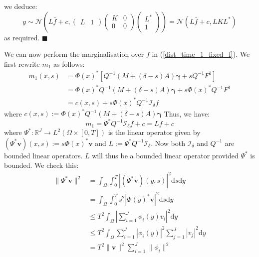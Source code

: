 \documentclass{article}
\renewcommand\qedsymbol{$\blacksquare$}
\theoremstyle{definition}
\theoremstyle{remark}
\theoremstyle{remark}
\begin{document}
we deduce:
\begin{equation*}
    y\sim\mathcal{N}\left(L\bar{f}+c, \begin{pmatrix}
        L & 1
    \end{pmatrix}\begin{pmatrix}
                    K & 0 \\
                    0 & 0
                \end{pmatrix}\begin{pmatrix}
                    L^{*} \\
                    1
                \end{pmatrix}\right)=\mathcal{N}(L\bar{f}+c,LKL^{*})
\end{equation*}
as required. \qedsymbol

We can now perform the marginalisation over $f$ in (\ref{dist_time_1_fixed_f}). We first rewrite $m_1$ as follows:
\begin{align*}
    m_{1}(x,s) &= \Phi(x)^{*}[Q^{-1}(M+(\delta-s)A)\boldsymbol{\gamma}+sQ^{-1}F^{1}] \\
    &= \Phi(x)^{*}Q^{-1}(M+(\delta-s)A)\boldsymbol{\gamma}+s\Phi(x)^{*}Q^{-1}F^{1} \\
    &=c(x,s) + s\Phi(x)^{*}Q^{-1}\mathcal{I}_{\delta}f
\end{align*}
where $c(x,s):=\Phi(x)^{*}Q^{-1}(M+(\delta-s)A)\boldsymbol{\gamma}$ Thus, we have:
\begin{equation*}
    m_1=\Psi^{*}Q^{-1}\mathcal{I}_{\delta}f+c=Lf+c
\end{equation*}
where $\Psi^{*}:\mathbb{R}^{J}\rightarrow L^{2}(\Omega\times[0,T])$ is the linear operator given by $(\Psi^{*}\boldsymbol{v})(x,s):=s\Phi(x)^{*}\boldsymbol{v}$ and $L:=\Psi^{*}Q^{-1}\mathcal{I}_{\delta}$. Now both $\mathcal{I}_{\delta}$ and $Q^{-1}$ are bounded linear operators. $L$ will thus be a bounded linear operator provided $\Psi^{*}$ is bounded. We check this:
\begin{align*}
    \|\Psi^{*}\boldsymbol{v}\|^{2} &= \int_{\Omega}\int_{0}^{T}|(\Psi^{*}\boldsymbol{v})(y,s)|^{2}\mathrm{d}s\mathrm{d}y \\
    &=\int_{\Omega}\int_{0}^{T}s^{2}|\Phi(y)^{*}\boldsymbol{v}|^{2}\mathrm{d}s\mathrm{d}y \\
    &\leq T^{2}\int_{\Omega}\left|\sum_{i=1}^{J}\phi_{i}(y)v_{i}\right|^{2}\mathrm{d}y \\
    &\leq T^{2}\int_{\Omega}\sum_{i=1}^{J}|\phi_{i}(y)|^{2}\sum_{j=1}^{J}|v_{j}|^{2}\mathrm{d}y \\
    &= T^{2}\|\boldsymbol{v}\|^{2}\sum_{i=1}^{J}\|\phi_{i}\|^{2}
\end{align*}
\end{document}
